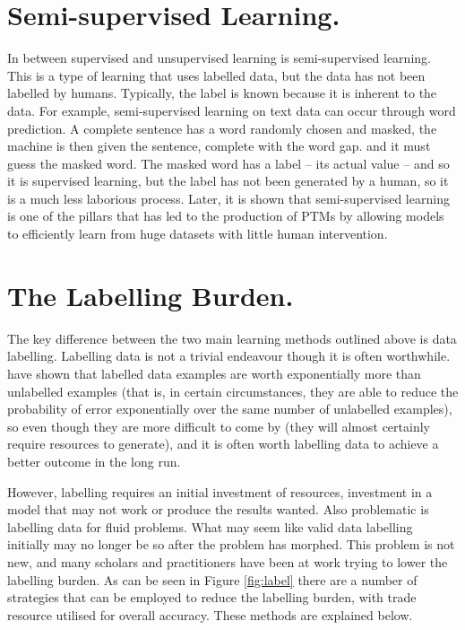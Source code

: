 \section{Semi-supervised Learning.} In between supervised and unsupervised learning is semi-supervised learning. This is a type of learning that uses labelled data, but the data has not been labelled by humans. Typically, the label is known because it is inherent to the data. For example, semi-supervised learning on text data can occur through word prediction. A complete sentence has a word randomly chosen and masked, the machine is then given the sentence, complete with the word gap. and it must guess the masked word. The masked word has a label  –  its actual value  –  and so it is supervised learning, but the label has not been generated by a human, so it is a much less laborious process. Later, it is shown that semi-supervised learning is one of the pillars that has led to the production of PTMs by allowing models to efficiently learn from huge datasets with little human intervention.


\section{The Labelling Burden.} The key difference between the two main learning methods outlined above is data labelling. Labelling data is not a trivial endeavour though it is often worthwhile. \textcite{castelli1995exponential}  have shown that labelled data examples are worth exponentially more than unlabelled examples (that is, in certain circumstances, they are able to reduce the probability of error exponentially over the same number of unlabelled examples), so even though they are more difficult to come by (they will almost certainly require resources to generate), and it is often worth labelling data to achieve a better outcome in the long run. 

However, labelling requires an initial investment of resources, investment in a model that may not work or produce the results wanted. Also problematic is labelling data for fluid problems. What may seem like valid data labelling initially may no longer be so after the problem has morphed. This problem is not new, and many scholars and practitioners have been at work trying to lower the labelling burden. As can be seen in Figure \ref{fig:label} there are a number of strategies that can be employed to reduce the labelling burden, with trade resource utilised for overall accuracy. These methods are explained below.



